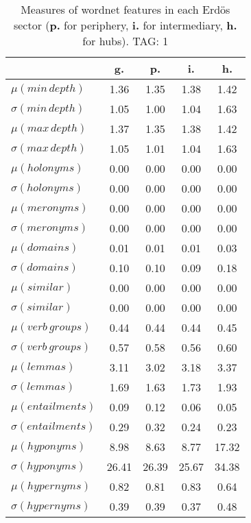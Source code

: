 \begin{table}[h!]
\begin{center}
\begin{tabular}{| l | c | c | c | c |}\hline
 & g. & p. & i. & h. \\\hline
$\mu(min\,depth)$ & 1.36  & 1.35  & 1.38  & 1.42 \\\hline
$\sigma(min\,depth)$ & 1.05  & 1.00  & 1.04  & 1.63 \\\hline
$\mu(max\,depth)$ & 1.37  & 1.35  & 1.38  & 1.42 \\\hline
$\sigma(max\,depth)$ & 1.05  & 1.01  & 1.04  & 1.63 \\\hline
$\mu(holonyms)$ & 0.00  & 0.00  & 0.00  & 0.00 \\\hline
$\sigma(holonyms)$ & 0.00  & 0.00  & 0.00  & 0.00 \\\hline
$\mu(meronyms)$ & 0.00  & 0.00  & 0.00  & 0.00 \\\hline
$\sigma(meronyms)$ & 0.00  & 0.00  & 0.00  & 0.00 \\\hline
$\mu(domains)$ & 0.01  & 0.01  & 0.01  & 0.03 \\\hline
$\sigma(domains)$ & 0.10  & 0.10  & 0.09  & 0.18 \\\hline
$\mu(similar)$ & 0.00  & 0.00  & 0.00  & 0.00 \\\hline
$\sigma(similar)$ & 0.00  & 0.00  & 0.00  & 0.00 \\\hline
$\mu(verb\,groups)$ & 0.44  & 0.44  & 0.44  & 0.45 \\\hline
$\sigma(verb\,groups)$ & 0.57  & 0.58  & 0.56  & 0.60 \\\hline
$\mu(lemmas)$ & 3.11  & 3.02  & 3.18  & 3.37 \\\hline
$\sigma(lemmas)$ & 1.69  & 1.63  & 1.73  & 1.93 \\\hline
$\mu(entailments)$ & 0.09  & 0.12  & 0.06  & 0.05 \\\hline
$\sigma(entailments)$ & 0.29  & 0.32  & 0.24  & 0.23 \\\hline
$\mu(hyponyms)$ & 8.98  & 8.63  & 8.77  & 17.32 \\\hline
$\sigma(hyponyms)$ & 26.41  & 26.39  & 25.67  & 34.38 \\\hline
$\mu(hypernyms)$ & 0.82  & 0.81  & 0.83  & 0.64 \\\hline
$\sigma(hypernyms)$ & 0.39  & 0.39  & 0.37  & 0.48 \\\hline
\end{tabular}
\caption{Measures of wordnet features in each Erd\"os sector ({{\bf p.}} for periphery, {{\bf i.}} for intermediary, {{\bf h.}} for hubs). TAG: 1}
\end{center}
\end{table}